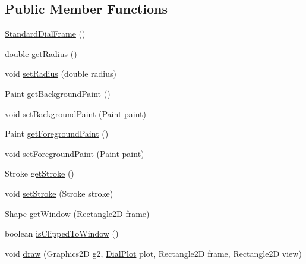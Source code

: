 \subsection*{Public Member Functions}
\begin{DoxyCompactItemize}
\item 
\mbox{\hyperlink{classorg_1_1jfree_1_1chart_1_1plot_1_1dial_1_1_standard_dial_frame_ac0eae7cda55d623aff3d58b86230f54a}{Standard\+Dial\+Frame}} ()
\item 
double \mbox{\hyperlink{classorg_1_1jfree_1_1chart_1_1plot_1_1dial_1_1_standard_dial_frame_a639863a0f87163756360dc72f3faa719}{get\+Radius}} ()
\item 
void \mbox{\hyperlink{classorg_1_1jfree_1_1chart_1_1plot_1_1dial_1_1_standard_dial_frame_a775d5be898cb10aed3d5b8489673b0f4}{set\+Radius}} (double radius)
\item 
Paint \mbox{\hyperlink{classorg_1_1jfree_1_1chart_1_1plot_1_1dial_1_1_standard_dial_frame_a4013ea01b3765b274b3d99978a54eba7}{get\+Background\+Paint}} ()
\item 
void \mbox{\hyperlink{classorg_1_1jfree_1_1chart_1_1plot_1_1dial_1_1_standard_dial_frame_a3b3dce37f8a677dad3aa432c862a4c11}{set\+Background\+Paint}} (Paint paint)
\item 
Paint \mbox{\hyperlink{classorg_1_1jfree_1_1chart_1_1plot_1_1dial_1_1_standard_dial_frame_ac5647162c4aa638d569d1fb72337d354}{get\+Foreground\+Paint}} ()
\item 
void \mbox{\hyperlink{classorg_1_1jfree_1_1chart_1_1plot_1_1dial_1_1_standard_dial_frame_a5d1e2b7bc485b692abc4e28cd2d2ea5e}{set\+Foreground\+Paint}} (Paint paint)
\item 
Stroke \mbox{\hyperlink{classorg_1_1jfree_1_1chart_1_1plot_1_1dial_1_1_standard_dial_frame_acbf9547e14794fe78b448966cabe6051}{get\+Stroke}} ()
\item 
void \mbox{\hyperlink{classorg_1_1jfree_1_1chart_1_1plot_1_1dial_1_1_standard_dial_frame_a8636b33867fa14b44589e7f20fc33ec1}{set\+Stroke}} (Stroke stroke)
\item 
Shape \mbox{\hyperlink{classorg_1_1jfree_1_1chart_1_1plot_1_1dial_1_1_standard_dial_frame_aa32ae5b534b6461b43ae970382ac18ea}{get\+Window}} (Rectangle2D frame)
\item 
boolean \mbox{\hyperlink{classorg_1_1jfree_1_1chart_1_1plot_1_1dial_1_1_standard_dial_frame_a3d7725c15ddb58b403492a1f4f48a24a}{is\+Clipped\+To\+Window}} ()
\item 
void \mbox{\hyperlink{classorg_1_1jfree_1_1chart_1_1plot_1_1dial_1_1_standard_dial_frame_a16869a6511a52d288766710d40ce4e97}{draw}} (Graphics2D g2, \mbox{\hyperlink{classorg_1_1jfree_1_1chart_1_1plot_1_1dial_1_1_dial_plot}{Dial\+Plot}} plot, Rectangle2D frame, Rectangle2D view)

\end{DoxyCompactItemize}
